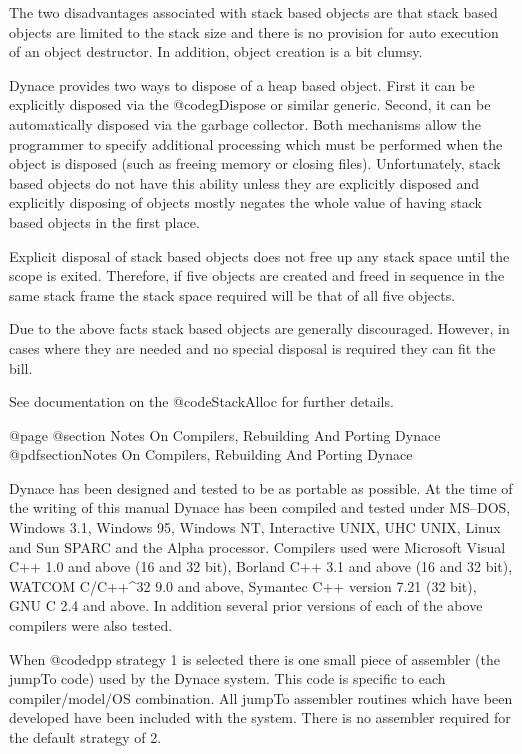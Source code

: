 The two disadvantages associated with stack based objects are that stack
based objects are limited to the stack size and there is no provision
for auto execution of an object destructor.  In addition, object
creation is a bit clumsy.

Dynace provides two ways to dispose of a heap based object.  First it
can be explicitly disposed via the @code{gDispose} or similar generic.
Second, it can be automatically disposed via the garbage collector.
Both mechanisms allow the programmer to specify additional processing
which must be performed when the object is disposed (such as freeing
memory or closing files).  Unfortunately, stack based objects do not have
this ability unless they are explicitly disposed and explicitly disposing
of objects mostly negates the whole value of having stack based objects
in the first place.

Explicit disposal of stack based objects does not free up any stack
space until the scope is exited.  Therefore, if five objects are created
and freed in sequence in the same stack frame the stack space required
will be that of all five objects.

Due to the above facts stack based objects are generally discouraged.
However, in cases where they are needed and no special disposal
is required they can fit the bill.

See documentation on the @code{StackAlloc} for further details.


@page
@section Notes On Compilers, Rebuilding And Porting Dynace
@pdfsection{Notes On Compilers, Rebuilding And Porting Dynace}

Dynace has been designed and tested to be as portable as possible.  At
the time of the writing of this manual Dynace has been compiled and
tested under MS--DOS, Windows 3.1, Windows 95, Windows NT, Interactive
UNIX, UHC UNIX, Linux and Sun SPARC and the Alpha processor.  Compilers
used were Microsoft Visual C++ 1.0 and above (16 and 32 bit), Borland
C++ 3.1 and above (16 and 32 bit), WATCOM C/C++^32 9.0 and above,
Symantec C++ version 7.21 (32 bit), GNU C 2.4 and above.  In addition
several prior versions of each of the above compilers were also tested.

When @code{dpp} strategy 1 is selected there is one small piece of
assembler (the jumpTo code) used by the Dynace system.  This code is
specific to each compiler/model/OS combination.  All jumpTo assembler
routines which have been developed have been included with the system.
There is no assembler required for the default strategy of 2.

